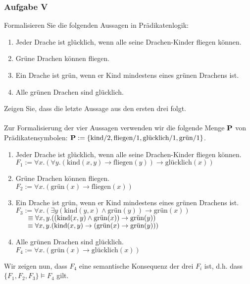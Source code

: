 \subsubsection*{Aufgabe V}
\label{REP3-V}
Formalisieren Sie die folgenden Aussagen in Prädikatenlogik:
\begin{enumerate}
\item Jeder Drache ist glücklich, wenn alle seine Drachen-Kinder fliegen können.
\item Grüne Drachen können fliegen.
\item Ein Drache ist grün, wenn er Kind mindestens eines grünen Drachens ist.
\item Alle grünen Drachen sind glücklich.
\end{enumerate}
Zeigen Sie, dass die letzte Aussage aus den ersten drei folgt. \\\\
\LOES Zur Formalisierung der vier Aussagen verwenden wir die folgende Menge $\textbf{P}$ von Prädikatensymbolen: $\textbf{P} := \{\text{kind}/2, \text{fliegen}/1, \text{glücklich}/1, \text{grün}/1 \}$.
\begin{enumerate}
\item Jeder Drache ist glücklich, wenn alle seine Drachen-Kinder fliegen können.\\
$F_1 := \forall x.(\forall y.(\text{kind}(x,y) \to \text{fliegen}(y)) \to \text{glücklich}(x))$
\item Grüne Drachen können fliegen. \\
$F_2 := \forall x.(\text{grün}(x) \to \text{fliegen}(x))$
\item Ein Drache ist grün, wenn er Kind mindestens eines grünen Drachens ist. \\
$F_3 := \forall x.(\exists y(\text{kind}(y, x) \land \text{grün}(y)) \to \text{grün}(x))$ \\
$\phantom{F_3}\hspace{0.3em} \equiv \forall x,y.((\text{kind}(x, y) \land \text{grün}(x)) \to \text{grün}(y))$ \\
$\phantom{F_3}\hspace{0.3em} \equiv \forall x,y.(\text{kind}(x,y) \to (\text{grün}(x) \to \text{grün}(y)))$
\item Alle grünen Drachen sind glücklich. \\
$F_4 := \forall x.(\text{grün}(x) \to \text{glücklich}(x))$
\end{enumerate}
Wir zeigen nun, dass $F_4$ eine semantische Konsequenz der drei $F_i$ ist, d.h. dass $\{F_1, F_2, F_3 \} \models F_4$ gilt.
